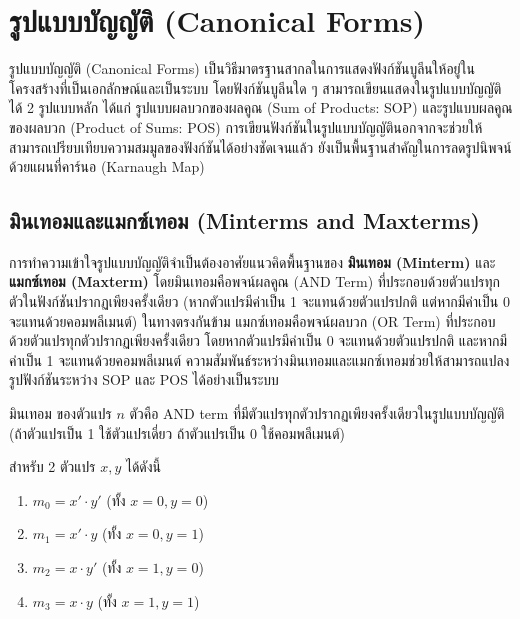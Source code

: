 \section{รูปแบบบัญญัติ (Canonical Forms)}
\label{sec:canonical-forms}

รูปแบบบัญญัติ (Canonical Forms) เป็นวิธีมาตรฐานสากลในการแสดงฟังก์ชันบูลีนให้อยู่ในโครงสร้างที่เป็นเอกลักษณ์และเป็นระบบ โดยฟังก์ชันบูลีนใด ๆ สามารถเขียนแสดงในรูปแบบบัญญัติได้ 2 รูปแบบหลัก ได้แก่ รูปแบบผลบวกของผลคูณ (Sum of Products: SOP) และรูปแบบผลคูณของผลบวก (Product of Sums: POS) การเขียนฟังก์ชันในรูปแบบบัญญัตินอกจากจะช่วยให้สามารถเปรียบเทียบความสมมูลของฟังก์ชันได้อย่างชัดเจนแล้ว ยังเป็นพื้นฐานสำคัญในการลดรูปนิพจน์ด้วยแผนที่คาร์นอ (Karnaugh Map)~\parencite{roth2021logic}

\subsection{มินเทอมและแมกซ์เทอม (Minterms and Maxterms)}
การทำความเข้าใจรูปแบบบัญญัติจำเป็นต้องอาศัยแนวคิดพื้นฐานของ \textbf{มินเทอม (Minterm)} และ \textbf{แมกซ์เทอม (Maxterm)} โดยมินเทอมคือพจน์ผลคูณ (AND Term) ที่ประกอบด้วยตัวแปรทุกตัวในฟังก์ชันปรากฏเพียงครั้งเดียว (หากตัวแปรมีค่าเป็น 1 จะแทนด้วยตัวแปรปกติ แต่หากมีค่าเป็น 0 จะแทนด้วยคอมพลีเมนต์) ในทางตรงกันข้าม แมกซ์เทอมคือพจน์ผลบวก (OR Term) ที่ประกอบด้วยตัวแปรทุกตัวปรากฏเพียงครั้งเดียว โดยหากตัวแปรมีค่าเป็น 0 จะแทนด้วยตัวแปรปกติ และหากมีค่าเป็น 1 จะแทนด้วยคอมพลีเมนต์ ความสัมพันธ์ระหว่างมินเทอมและแมกซ์เทอมช่วยให้สามารถแปลงรูปฟังก์ชันระหว่าง SOP และ POS ได้อย่างเป็นระบบ~\parencite{wakerly2018digital}

\begin{definition}[มินเทอม]
มินเทอม ของตัวแปร $n$ ตัวคือ AND term ที่มีตัวแปรทุกตัวปรากฏเพียงครั้งเดียวในรูปแบบบัญญัติ (ถ้าตัวแปรเป็น 1 ใช้ตัวแปรเดี่ยว ถ้าตัวแปรเป็น 0 ใช้คอมพลีเมนต์)

สำหรับ 2 ตัวแปร $x, y$ ได้ดังนี้
\begin{enumerate}
    \item $m_0 = x' \cdot y'$ (ทั้ง $x = 0, y = 0$)
    \item $m_1 = x' \cdot y$ (ทั้ง $x = 0, y = 1$)
    \item $m_2 = x \cdot y'$ (ทั้ง $x = 1, y = 0$)
    \item $m_3 = x \cdot y$ (ทั้ง $x = 1, y = 1$)
\end{enumerate}
\end{definition}

